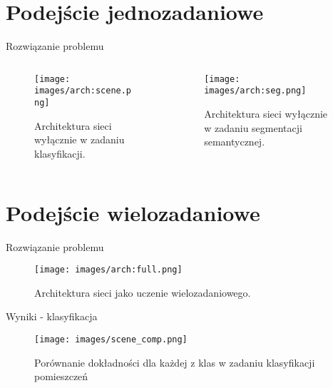 \documentclass[10pt]{beamer}
\begin{document}
\section*{Podejście jednozadaniowe}
\begin{frame}{Rozwiązanie problemu}
    \begin{columns}
        \begin{column}{0.5\textwidth}
            \begin{figure}
                \texttt{[image: images/arch:scene.png]}
                \caption{Architektura sieci wyłącznie w zadaniu klasyfikacji.}
            \end{figure}
            
        \end{column}
        
        \begin{column}{0.5\textwidth}
            \begin{figure}
                \texttt{[image: images/arch:seg.png]}
                \caption{Architektura sieci wyłącznie w zadaniu segmentacji semantycznej.}
            \end{figure}
            
        \end{column}
    \end{columns}

\end{frame}
\section*{Podejście wielozadaniowe}
\begin{frame}{Rozwiązanie problemu}
    \begin{figure}
        \texttt{[image: images/arch:full.png]}
        \caption{Architektura sieci jako uczenie wielozadaniowego.}
    \end{figure}
\end{frame}
    
\begin{frame}{Wyniki - klasyfikacja}
    \begin{figure}
        \texttt{[image: images/scene\_comp.png]}
        \caption{Porównanie dokładności dla każdej z klas w zadaniu klasyfikacji pomieszczeń}
    \end{figure}
\end{frame}    
    
\end{document}
